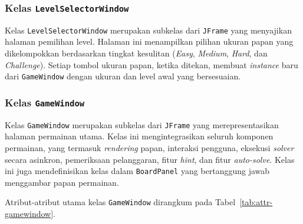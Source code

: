 \subsubsection{Kelas \texttt{LevelSelectorWindow}}
\label{subsubsec:kelas-levelselector}

Kelas \texttt{LevelSelectorWindow} merupakan subkelas dari \texttt{JFrame} yang menyajikan halaman pemilihan level. Halaman ini menampilkan pilihan ukuran papan yang dikelompokkan berdasarkan tingkat kesulitan (\textit{Easy}, \textit{Medium}, \textit{Hard}, dan \textit{Challenge}). Setiap tombol ukuran papan, ketika ditekan, membuat \textit{instance} baru dari \texttt{GameWindow} dengan ukuran dan level awal yang bersesuaian.

\subsubsection{Kelas \texttt{GameWindow}}
\label{subsubsec:kelas-gamewindow}

Kelas \texttt{GameWindow} merupakan subkelas dari \texttt{JFrame} yang merepresentasikan halaman permainan utama. Kelas ini mengintegrasikan seluruh komponen permainan, yang termasuk \textit{rendering} papan, interaksi pengguna, eksekusi \textit{solver} secara asinkron, pemeriksaan pelanggaran, fitur \textit{hint}, dan fitur \textit{auto-solve}. Kelas ini juga mendefinisikan kelas dalam \texttt{BoardPanel} yang bertanggung jawab menggambar papan permainan.

Atribut-atribut utama kelas \texttt{GameWindow} dirangkum pada Tabel~\ref{tab:attr-gamewindow}.

